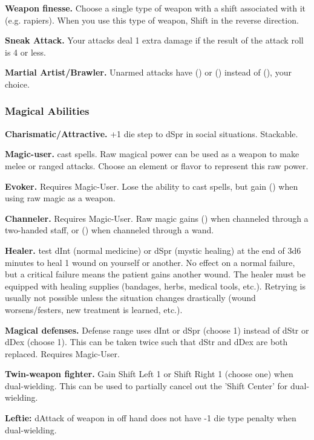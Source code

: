 \documentclass[10pt,twoside,twocolumn,openany]{book}
\begin{document}
\par \textbf{Weapon finesse.} Choose a single type of weapon with a shift associated with it (e.g. rapiers). When you use this type of weapon, Shift in the reverse direction.
\par \textbf{Sneak Attack.} Your attacks deal 1 extra damage if the result of the attack roll is 4 or less.
\par \textbf{Martial Artist/Brawler.} Unarmed attacks have (\shiftleft) or (\shiftright) instead of (\shiftcenter), your choice.

\subsubsection{Magical Abilities}

\par \textbf{Charismatic/Attractive.} +1 die step to dSpr in social situations. Stackable.
\par \textbf{Magic-user.} cast spells. Raw magical power can be used as a weapon to make melee or ranged attacks. Choose an element or flavor to represent this raw power.
\par \textbf{Evoker.} Requires Magic-User. Lose the ability to cast spells, but gain (\shiftout) when using raw magic as a weapon.
\par \textbf{Channeler.} Requires Magic-User. Raw magic gains (\shiftright) when channeled through a two-handed staff, or (\shiftleft) when channeled through a wand.
\par \textbf{Healer.} test dInt (normal medicine) or dSpr (mystic healing) at the end of 3d6 minutes to heal 1 wound on yourself or another. No effect on a normal failure, but a critical failure means the patient gains another wound. The healer must be equipped with healing supplies (bandages, herbs, medical tools, etc.). Retrying is usually not possible unless the situation changes drastically (wound worsens/festers, new treatment is learned, etc.).
\par \textbf{Magical defenses.} Defense range uses dInt or dSpr (choose 1) instead of dStr or dDex (choose 1). This can be taken twice such that dStr and dDex are both replaced. Requires Magic-User.
\par \textbf{Twin-weapon fighter.} Gain Shift Left 1 or Shift Right 1 (choose one) when dual-wielding. This can be used to partially cancel out the 'Shift Center' for dual-wielding.
\par \textbf{Leftie:} dAttack of weapon in off hand does not have -1 die type penalty when dual-wielding.
\end{document}
